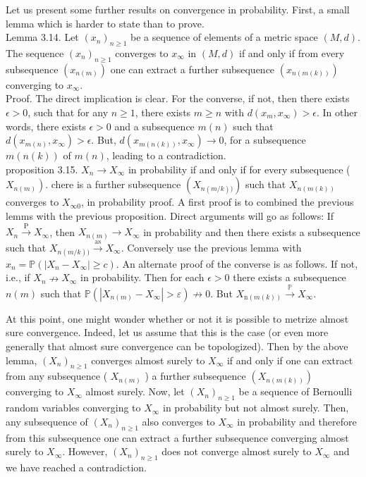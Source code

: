 \documentclass[11pt]{amsbook}
\theoremstyle{plain}%
\theoremstyle{definition}
\theoremstyle{remark}
\begin{document}
Let us present some further results on convergence in probability. First, a small lemma which is harder to state than to prove.\\
Lemma 3.14. Let $\left(x_{n}\right)_{n \geq 1}$ be a sequence of elements of a metric space $(M, d)$. The sequence $\left(x_{n}\right)_{n \geq 1}$ converges to $x_{\infty}$ in $(M, d)$ if and only if from every subsequence $\left(x_{n(m)}\right)$ one can extract a further subsequence $\left(x_{n(m(k))}\right)$ converging to $x_{\infty}$.\\
Proof. The direct implication is clear. For the converse, if not, then there exists $\epsilon>0$, such that for any $n \geq 1$, there exists $m \geq n$ with $d\left(x_{m}, x_{\infty}\right)>\epsilon$. In other words, there exists $\epsilon>0$ and a subsequence $m(n)$ such that $d\left(x_{m(n)}, x_{\infty}\right)>\epsilon$. But, $d\left(x_{m(n(k))}, x_{\infty}\right) \rightarrow 0$, for a subsequence $m(n(k))$ of $m(n)$, leading to a contradiction.\\
proposition 3.15. $X_{n} \rightarrow X_{\infty}$ in probability if and only if for every subsequence ( $\left.X_{n(m)}\right)$. chere is a further subsequence $\left(X_{n(m / k))}\right)$ such that $X_{n(m(k))}$ converges to $X_{\infty 0}$, in probability proof. A first proof is to combined the previous lemms with the previous proposition. Direct arguments will go as follows: If $X_{n} \xrightarrow{\mathrm{P}} X_{\infty}$, then $X_{n(m)} \rightarrow X_{\infty}$ in probability and then there exists a subsequence such that $X_{n(m / k))} \xrightarrow{\mathrm{as}} X_{\infty}$. Conversely use the previous lemma with $x_{n}=\mathbb{P}\left(\left|X_{n}-X_{\infty}\right| \geq c\right)$. An alternate proof of the converse is as follows. If not, i.e., if $X_{n} \nrightarrow X_{\infty}$ in probability. Then for each $\epsilon>0$ there exists a subsequence $n(m)$ such that $\mathbb{P}\left(\left|X_{n(m)}-X_{\infty}\right|>\varepsilon\right) \nrightarrow 0$. But $X_{\mathrm{n}(m(k))} \xrightarrow{\mathbb{P}} X_{\infty}$.

At this point, one might wonder whether or not it is possible to metrize almost sure convergence. Indeed, let us assume that this is the case (or even more generally that almost sure convergence can be topologized). Then by the above lemma, $\left(X_{n}\right)_{n \geq 1}$ converges almost surely to $X_{\infty}$ if and only if one can extract from any subsequence ( $X_{n(m)}$ ) a further subsequence $\left(X_{n(m(k))}\right)$ converging to $X_{\infty}$ almost surely. Now, let $\left(X_{n}\right)_{n \geq 1}$ be a sequence of Bernoulli random variables converging to $X_{\infty}$ in probability but not almost surely. Then, any subsequence of $\left(X_{n}\right)_{n \geq 1}$ also converges to $X_{\infty}$ in probability and therefore from this subsequence one can extract a further subsequence converging almost surely to $X_{\infty}$. However, $\left(X_{n}\right)_{n \geq 1}$ does not converge almost surely to $X_{\infty}$ and we have reached a contradiction.
\end{document}
